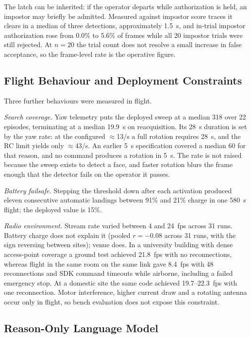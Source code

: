 \documentclass[conference]{IEEEtran}
\begin{document}
The latch can be inherited: if the operator departs while authorization is held,
an impostor may briefly be admitted. Measured against impostor score traces it
clears in a median of three detections, approximately 1.5~s, and in-trial
impostor authorization rose from 0.0\% to 5.6\% of frames while all 20 impostor
trials were still rejected. At $n=20$ the trial count does not resolve a small
increase in false acceptance, so the frame-level rate is the operative figure.

\subsection{Flight Behaviour and Deployment Constraints}
\label{sec:flightbehaviour}

Three further behaviours were measured in flight.

\emph{Search coverage.} Yaw telemetry puts the deployed sweep at a median
318\textdegree{} over 22 episodes, terminating at a median 19.9~s on
reacquisition. Its 28~s duration is set by the yaw rate: at the configured
$\approx$13\textdegree/s a full rotation requires 28~s, and the RC limit yields
only $\approx$43\textdegree/s. An earlier 5~s specification covered a median
60\textdegree{} for that reason, and no command produces a rotation in 5~s. The
rate is not raised because the sweep exists to detect a face, and faster
rotation blurs the frame enough that the detector fails on the operator it
passes.

\emph{Battery failsafe.} Stepping the threshold down after each activation
produced eleven consecutive automatic landings between 91\% and 21\% charge in
one 580~s flight; the deployed value is 15\%.

\emph{Radio environment.} Stream rate varied between 4 and 24~fps across 31 runs.
Battery charge does not explain it (pooled $r=-0.08$ across 31 runs, with the
sign reversing between sites); venue does. In a university building with dense access-point coverage a
ground test achieved 21.8~fps with no reconnections, whereas flight in the same
room on the same link gave 8.4~fps with 48 reconnections and SDK command timeouts
while airborne, including a failed emergency stop. At a domestic site the same
code achieved 19.7--22.3~fps with one reconnection. Motor interference, higher
current draw and a rotating antenna occur only in flight, so bench evaluation
does not expose this constraint.

\subsection{Reason-Only Language Model}
\label{sec:llm}
\end{document}
